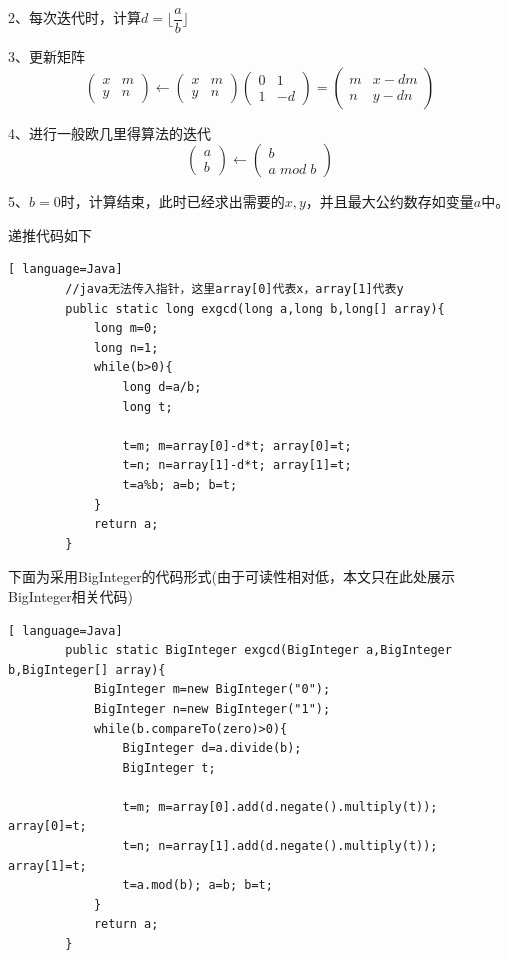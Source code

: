 \documentclass[UTF8,a4paper,10.5pt,twocolumn]{ctexart}
\begin{document}
	\par 2、每次迭代时，计算$d=\lfloor\dfrac{a}{b}\rfloor$

	\par 3、更新矩阵
	   $$
	   \left(\begin{matrix}x & m\\y & n\end{matrix}\right) \leftarrow
	   \left(\begin{matrix}x & m\\y & n\end{matrix}\right) \left(\begin{matrix}0 & 1\\1 & -d\end{matrix}\right) =
	   \left(\begin{matrix}m & x-dm\\n & y-dn\end{matrix}\right)
	   $$

	\par 4、进行一般欧几里得算法的迭代
	   $$
	   \left(\begin{matrix}a\\b\end{matrix}\right) \leftarrow
	   \left(\begin{matrix}b\\a\; mod \; b\end{matrix}\right)
	   $$

	\par 5、$b=0$时，计算结束，此时已经求出需要的$x,y$，并且最大公约数存如变量$a$中。
	\par 递推代码如下
	\begin{lstlisting}[ language=Java]
		//java无法传入指针，这里array[0]代表x，array[1]代表y
		public static long exgcd(long a,long b,long[] array){
		    long m=0;
		    long n=1;
		    while(b>0){
		        long d=a/b;
		        long t;
		        
		        t=m; m=array[0]-d*t; array[0]=t;
		        t=n; n=array[1]-d*t; array[1]=t;
		        t=a%b; a=b; b=t;
		    }
		    return a;
		}
	\end{lstlisting}
	
	\par 下面为采用BigInteger的代码形式(由于可读性相对低，本文只在此处展示BigInteger相关代码)
	\begin{lstlisting}[ language=Java]
		public static BigInteger exgcd(BigInteger a,BigInteger b,BigInteger[] array){
		    BigInteger m=new BigInteger("0");
		    BigInteger n=new BigInteger("1");
			while(b.compareTo(zero)>0){
		        BigInteger d=a.divide(b); 
		        BigInteger t;
		
		        t=m; m=array[0].add(d.negate().multiply(t)); array[0]=t;
		        t=n; n=array[1].add(d.negate().multiply(t)); array[1]=t;
		        t=a.mod(b); a=b; b=t;
		    }
		    return a;
		}
	\end{lstlisting}
\end{document}
